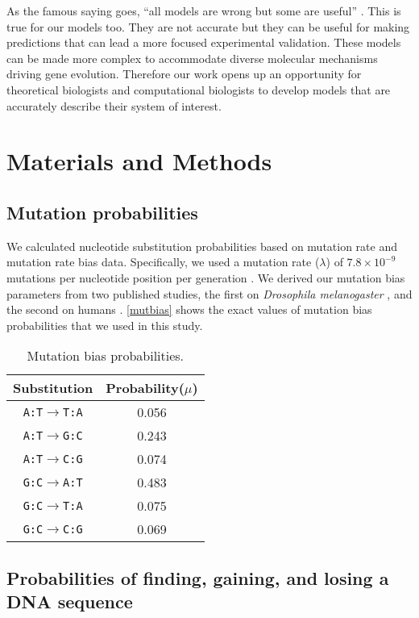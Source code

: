 \documentclass[12pt,a4paper]{article}
\begin{document}
As the famous saying goes, ``all models are wrong but some are useful'' \citep{GEBox}. This is true for our models too. They are not accurate but they can be useful for making predictions that can lead a more focused experimental validation. These models can be made more complex to accommodate diverse molecular mechanisms driving gene evolution. Therefore our work opens up an opportunity for theoretical biologists and computational biologists to develop models that are accurately describe their system of interest.

\section{Materials and Methods}

\subsection{Mutation probabilities}

We calculated nucleotide substitution probabilities based on mutation rate and mutation rate bias data. Specifically, we  used a mutation rate ($\lambda$) of $7.8\times10^{-9}$ mutations per nucleotide position per generation \citep{drosophilamutrate}. We derived our mutation bias parameters from two published studies, the first on \textit{Drosophila melanogaster} \citep{drosophilamutrate}, and the second on humans \citep{humanmutrate}. \autoref{mutbias} shows the exact values of mutation bias probabilities that we used in this study.

\begin{table}[H]
\centering
\begin{tabular}{c c}
\toprule
\textbf{Substitution} & Probability($\mu$) \\\midrule
\texttt{A:T}$\to$\texttt{T:A} & 0.056 \\\midrule
\texttt{A:T}$\to$\texttt{G:C} & 0.243 \\\midrule
\texttt{A:T}$\to$\texttt{C:G} & 0.074 \\\midrule
\texttt{G:C}$\to$\texttt{A:T} & 0.483 \\\midrule
\texttt{G:C}$\to$\texttt{T:A} & 0.075 \\\midrule
\texttt{G:C}$\to$\texttt{C:G} & 0.069 \\\bottomrule
\end{tabular}
\caption{Mutation bias probabilities.}
\label{mutbias}
\end{table}

\subsection{Probabilities of finding, gaining, and losing a DNA sequence}
\label{methbasic}
\end{document}
